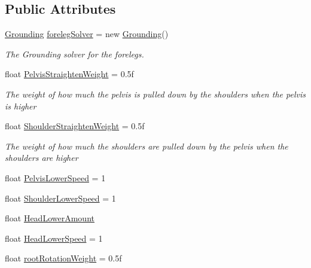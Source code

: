\subsection*{Public Attributes}
\begin{DoxyCompactItemize}
\item 
\mbox{\hyperlink{class_root_motion_1_1_final_i_k_1_1_grounding}{Grounding}} \mbox{\hyperlink{class_root_motion_1_1_final_i_k_1_1_grounder_quadruped_a726fa8fbb9d7e8d0cd3b21baca6f3148}{foreleg\+Solver}} = new \mbox{\hyperlink{class_root_motion_1_1_final_i_k_1_1_grounding}{Grounding}}()
\begin{DoxyCompactList}\small\item\em The Grounding solver for the forelegs. \end{DoxyCompactList}\item 
float \mbox{\hyperlink{class_root_motion_1_1_final_i_k_1_1_grounder_quadruped_a4e873b5daad3d41836c2bf5e6071d7eb}{Pelvis\+Straighten\+Weight}} = 0.\+5f
\begin{DoxyCompactList}\small\item\em The weight of how much the pelvis is pulled down by the shoulders when the pelvis is higher \end{DoxyCompactList}\item 
float \mbox{\hyperlink{class_root_motion_1_1_final_i_k_1_1_grounder_quadruped_aaab39b94a895710f9628c14f7a0c75bd}{Shoulder\+Straighten\+Weight}} = 0.\+5f
\begin{DoxyCompactList}\small\item\em The weight of how much the shoulders are pulled down by the pelvis when the shoulders are higher \end{DoxyCompactList}\item 
float \mbox{\hyperlink{class_root_motion_1_1_final_i_k_1_1_grounder_quadruped_a9824078dbb8a7521e99b0ccb92524f96}{Pelvis\+Lower\+Speed}} = 1
\item 
float \mbox{\hyperlink{class_root_motion_1_1_final_i_k_1_1_grounder_quadruped_a360b7c1d02814a1796faca9aacfa47e6}{Shoulder\+Lower\+Speed}} = 1
\item 
float \mbox{\hyperlink{class_root_motion_1_1_final_i_k_1_1_grounder_quadruped_add153a6a03dca1351267957e5d52d831}{Head\+Lower\+Amount}}
\item 
float \mbox{\hyperlink{class_root_motion_1_1_final_i_k_1_1_grounder_quadruped_a8eb4575c1389a92192d357aa5f42cdc0}{Head\+Lower\+Speed}} = 1
\item 
float \mbox{\hyperlink{class_root_motion_1_1_final_i_k_1_1_grounder_quadruped_a97e4b6347784bbd75e69f162587fae13}{root\+Rotation\+Weight}} = 0.\+5f

\end{DoxyCompactItemize}
